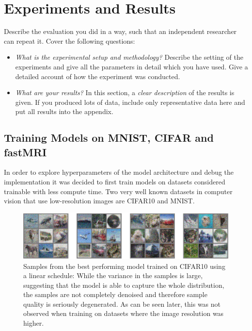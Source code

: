 %
\newpage
\chapter{Experiments and Results}
\label{sec:experimentsandresults}
Describe the evaluation you did in a way, such that an independent researcher can repeat it. Cover the following questions:
\begin{itemize}
    \item \textit{What is the experimental setup and methodology?} Describe the setting of the experiments and give all the parameters in detail which you have used. Give a detailed account of how the experiment was conducted.
    \item \textit{What are your results?} In this section, a \emph{clear description} of the results is given. If you produced lots of data, include only representative data here and put all results into the appendix.
\end{itemize}

\section{Training Models on MNIST, CIFAR and fastMRI}
In order to explore hyperparameters of the model architecture and debug the implementation it was decided to first train models on datasets considered trainable with less compute time. Two very well known datasets in computer vision that use low-resolution images are CIFAR10 and MNIST.~\autocite{cifar,mnist}
\begin{figure}[h]
    \centering
    \includegraphics[width=.75\textwidth]{images/cifarsamples.png}
    \caption[Samples generated from CIFAR10]{Samples from the best performing model trained on CIFAR10 using a linear schedule: While the variance in the samples is large, suggesting that the model is able to capture the whole distribution, the samples are not completely denoised and therefore sample quality is seriously degenerated. As can be seen later, this was not observed when training on datasets where the image resolution was higher.}
    \label{fig:cifarsamples}
\end{figure}

